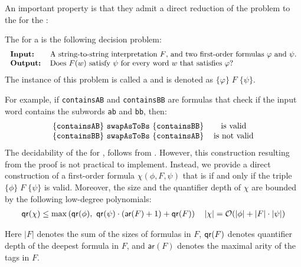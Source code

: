 An important property  is that they admit a direct
reduction of the  problem to the  for the :
\begin{definition}
    The  for a  is the following decision problem: 
    \[
        \begin{tabular}{ll}
        \textbf{Input:} & A string-to-string interpretation $F$, and two first-order formulas $\varphi$ and $\psi$.\\
        \textbf{Output:} & Does $F(w)$ satisfy $\psi$ for every word $w$ that satisfies $\varphi$?
        \end{tabular}
    \]
    The instance of this problem is called a  and is denoted as $\{ \varphi \}\; F\; \{ \psi \}$. 
\end{definition}
For example, if \texttt{containsAB} and \texttt{containsBB} are formulas that check if the input word contains the
subwords \texttt{ab} and \texttt{bb}, then:
\[
\begin{tabular}{ccl}
$\{ \mathtt{containsAB} \}\ \texttt{swapAsToBs}\ \{ \mathtt{containsBB} \}$ & is  valid\\
$\{ \mathtt{containsBB} \}\ \mathtt{swapAsToBs}\ \{ \mathtt{containsAB} \}$ & is not  valid
\end{tabular}
\]
The decidability of the  for ,
follows from \cite[Theorem~1.7]{bojanczyk2018polyregular}. However, this construction resulting from the proof is not practical to implement.
Instead, we provide a direct construction of a first-order formula $\chi(\phi, F, \psi)$
that is  if and only if the triple $\{ \phi \}\; F\; \{ \psi \}$ is valid.
Moreover, the size and the quantifier depth of $\chi$ are bounded by the following low-degree polynomials:
\begin{align*}
    \mathop{\mathsf{qr}}(\chi) \leq \max\left(\mathop{\mathsf{qr}}(\phi),\ \mathop{\mathsf{qr}}(\psi) \cdot \left(\textsf{ar}(F) + 1\right)  + \mathop{\mathsf{qr}}(F)\right) \quad |\chi| = \mathcal{O} (|\phi| + |F| \cdot |\psi|)
\end{align*}

Here $|F|$ denotes the sum of the sizes of formulas in $F$,
$\mathop{\mathsf{qr}}(F)$ denotes quantifier depth of the deepest formula in $F$, 
and $\textsf{ar}(F)$ denotes the maximal arity of the tags in $F$.


